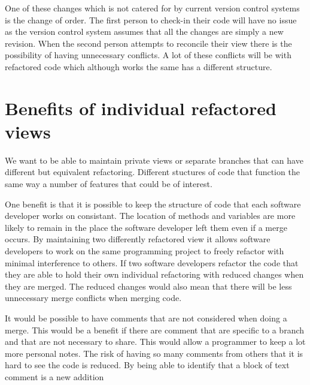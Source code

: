 
One of these changes which is not catered for by current version control systems is the change of order.  The first person to check-in their code will have no issue as the version control system assumes that all the changes are simply a new revision.  When the second person attempts to reconcile their view there is the possibility of having unnecessary conflicts.  A lot of these conflicts will be with refactored code which although works the same has a different structure.

\section{Benefits of individual refactored views}
We want to be able to maintain private views or separate branches that can have different but equivalent refactoring. Different stuctures of code that function the same way a number of features that could be of interest.

One benefit is that it is possible to keep the structure of code that each software developer works on consistant.  The location of methods and variables are more likely to remain in the place the software developer left them even if a merge occurs.
By maintaining two differently refactored view it allows software developers to work on the same programming project to freely refactor with minimal interference to others.
If two software developers refactor the code that they are able to hold their own individual refactoring with reduced changes when they are merged.
The reduced changes would also mean that there will be less unnecessary merge conflicts when merging code.

It would be possible to have comments that are not considered when doing a merge. This would be a benefit if there are comment that are specific to a branch and that are not necessary to share.  This would allow a programmer to keep a lot more personal notes.  The risk of having so many comments from others that it is hard to see the code is reduced. By being able to identify that a block of text comment is a new addition




